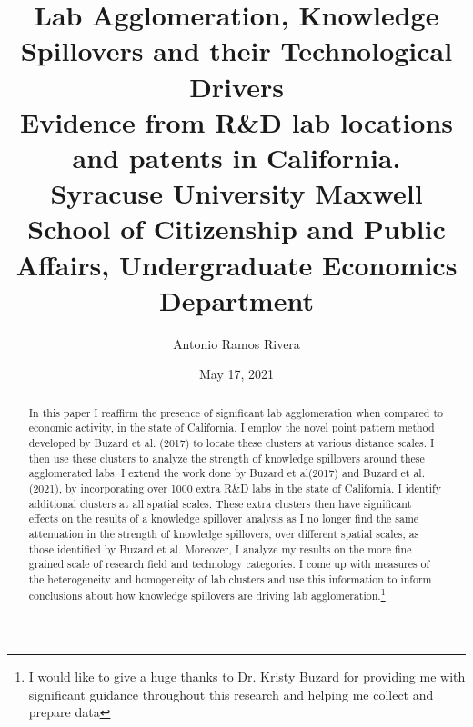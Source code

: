 \documentclass[12pt,letterpaper]{article}
\begin{document}
\title{\textbf{Lab Agglomeration, Knowledge Spillovers and their Technological Drivers}\\{\small \textbf{Evidence from R\&D lab locations and patents in California.}}\\{\small \textbf{Syracuse University Maxwell School of Citizenship and Public Affairs, Undergraduate Economics Department}}}
\author{Antonio Ramos Rivera}
\date{May 17, 2021}
\maketitle
\begin{abstract}
In this paper I reaffirm the presence of significant lab agglomeration when compared to economic activity, in the state of California. I employ the novel point pattern method developed by Buzard et al. (2017) to locate these clusters at various distance scales. I then use these clusters to analyze the strength of knowledge spillovers around these agglomerated labs. I extend the work done by Buzard et al(2017) and Buzard et al. (2021), by incorporating over 1000 extra R\&D labs in the state of California. I identify additional clusters at all spatial scales. These extra clusters then have significant effects on the results of a knowledge spillover analysis as I no longer find the same attenuation in the strength of knowledge spillovers, over different spatial scales, as those identified by Buzard et al. Moreover, I analyze my results on the more fine grained scale of research field and technology categories. I come up with measures of the heterogeneity and homogeneity of lab clusters and use this information to inform conclusions about how knowledge spillovers are driving lab agglomeration.\footnote{I would like to give a huge thanks to Dr. Kristy Buzard for providing me with significant guidance throughout this research and helping me collect and prepare data} 
\end{abstract}
\clearpage
\end{document}
